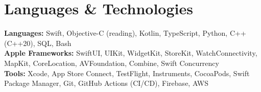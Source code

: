 \documentclass[letterpaper,11pt]{article}
\begin{document}
\section{Languages \& Technologies}
\begin{itemize}[leftmargin=0.15in, label={}]
  \small{\item{
    \textbf{Languages:} Swift, Objective-C (reading), Kotlin, TypeScript, Python, C++ (C++20), SQL, Bash \\
    \textbf{Apple Frameworks:} SwiftUI, UIKit, WidgetKit, StoreKit, WatchConnectivity, MapKit, CoreLocation, AVFoundation, Combine, Swift Concurrency \\
    \textbf{Tools:} Xcode, App Store Connect, TestFlight, Instruments, CocoaPods, Swift Package Manager, Git, GitHub Actions (CI/CD), Firebase, AWS
  }}
\end{itemize}
\end{document}
